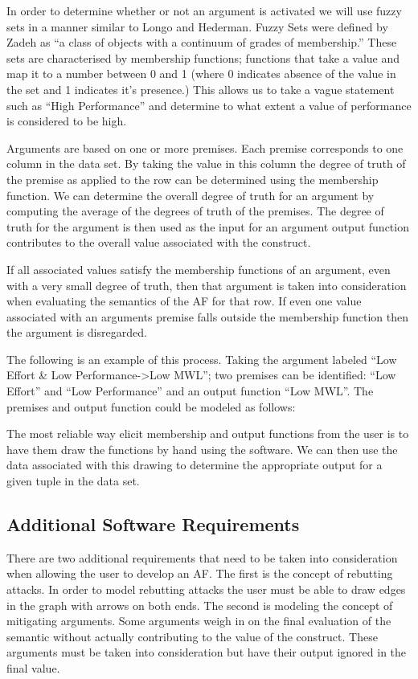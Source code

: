 In order to determine whether or not an argument is activated we will use fuzzy sets in a manner similar to Longo and Hederman. Fuzzy Sets were defined by Zadeh as ``a class of objects with a continuum of grades of membership.''\cite{zadeh1965fuzzy} These sets are characterised by membership functions; functions that take a value and map it to a number between 0 and 1 (where 0 indicates absence of the value in the set and 1 indicates it's presence.) This allows us to take a vague statement such as ``High Performance'' and determine to what extent a value of performance is considered to be high.

Arguments are based on one or more premises. Each premise corresponds to one column in the data set. By taking the value in this column the degree of truth of the premise as applied to the row can be determined using the membership function. We can determine the overall degree of truth for an argument by computing the average of the degrees of truth of the premises. The degree of truth for the argument is then used as the input for an argument output function contributes to the overall value associated with the construct.

If all associated values satisfy the membership functions of an argument, even with a very small degree of truth, then that argument is taken into consideration when evaluating the semantics of the AF for that row. If even one value associated with an arguments premise falls outside the membership function then the argument is disregarded.

The following is an example of this process. Taking the argument labeled ``Low Effort & Low Performance->Low MWL''; two premises can be identified: ``Low Effort'' and ``Low Performance'' and an output function ``Low MWL''. The premises and output function could be modeled as follows:




The most reliable way elicit membership and output functions from the user is to have them draw the functions by hand using the software. We can then use the data associated with this drawing to determine the appropriate output for a given tuple in the data set.

\subsection{Additional Software Requirements}

There are two additional requirements that need to be taken into consideration when allowing the user to develop an AF. The first is the concept of rebutting attacks. In order to model rebutting attacks the user must be able to draw edges in the graph with arrows on both ends. The second is modeling the concept of mitigating arguments. Some arguments weigh in on the final evaluation of the semantic without actually contributing to the value of the construct. These arguments must be taken into consideration but have their output ignored in the final value. 


